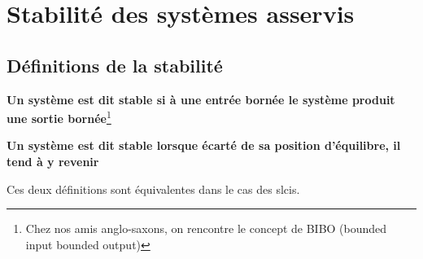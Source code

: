 \chapter{Stabilité des systèmes asservis\label{chap-stab}}
\minitoc
\newpage

\section{Définitions de la stabilité}

\textbf{Un système est dit stable si à une entrée bornée le système produit une sortie bornée}\footnote{Chez 
nos amis anglo-saxons, on rencontre le concept de BIBO (\og bounded input bounded output\fg)}

\textbf{Un système est dit stable lorsque écarté de sa position d'équilibre, il tend à y revenir}

Ces deux définitions sont équivalentes dans le cas des \glspl{slci}. 

